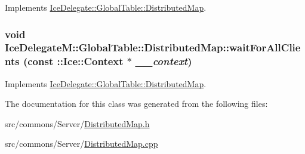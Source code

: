 Implements \hyperlink{class_ice_delegate_1_1_global_table_1_1_distributed_map_ab61ffb89d4f5e7aed0c9ef26db2cf08c}{IceDelegate::GlobalTable::DistributedMap}.

\hypertarget{class_ice_delegate_m_1_1_global_table_1_1_distributed_map_aca44b83949cf990bca5020ef81041635}{
\subsubsection[{waitForAllClients}]{\setlength{\rightskip}{0pt plus 5cm}void IceDelegateM::GlobalTable::DistributedMap::waitForAllClients (const ::Ice::Context $\ast$ {\em \_\-\_\-context})}}
\label{class_ice_delegate_m_1_1_global_table_1_1_distributed_map_aca44b83949cf990bca5020ef81041635}


Implements \hyperlink{class_ice_delegate_1_1_global_table_1_1_distributed_map_ad589c12e7d1d78e40769d30fc9d485c9}{IceDelegate::GlobalTable::DistributedMap}.



The documentation for this class was generated from the following files:\begin{DoxyCompactItemize}
\item 
src/commons/Server/\hyperlink{_distributed_map_8h}{DistributedMap.h}\item 
src/commons/Server/\hyperlink{_distributed_map_8cpp}{DistributedMap.cpp}\end{DoxyCompactItemize}
